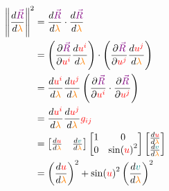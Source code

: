 \begin{align*}
    \norm{\frac{d\begingroup\color{violet}\vec{R}\endgroup}{d\begingroup\color{orange}\lambda\endgroup}}^2 &=
    \frac{d\begingroup\color{violet}\vec{R}\endgroup}{d\begingroup\color{orange}\lambda\endgroup} \cdot \frac{d\begingroup\color{violet}\vec{R}\endgroup}{d\begingroup\color{orange}\lambda\endgroup}\\
    &= \left(\frac{\partial \begingroup\color{violet}\vec{R}\endgroup}{\partial \begingroup\color{red}u^i\endgroup} \frac{d \begingroup\color{red}u^i\endgroup}{d \begingroup\color{orange}\lambda\endgroup}\right) \cdot 
    \left(\frac{\partial \begingroup\color{violet}\vec{R}\endgroup}{\partial \begingroup\color{red}u^j\endgroup}\frac{d \begingroup\color{red}u^j\endgroup}{d \begingroup\color{orange}\lambda\endgroup}\right)\\
    &= \frac{d \begingroup\color{red}u^i\endgroup}{d \begingroup\color{orange}\lambda\endgroup} \frac{d \begingroup\color{red}u^j\endgroup}{d \begingroup\color{orange}\lambda\endgroup}
    \left(\frac{\partial \begingroup\color{violet}\vec{R}\endgroup}{\partial \begingroup\color{red}u^i\endgroup} \cdot \frac{\partial \begingroup\color{violet}\vec{R}\endgroup}{\partial \begingroup\color{red}u^j\endgroup}\right)\\
    &= \frac{d \begingroup\color{red}u^i\endgroup}{d \begingroup\color{orange}\lambda\endgroup} \frac{d \begingroup\color{red}u^j\endgroup}{d \begingroup\color{orange}\lambda\endgroup} \begingroup\color{red}g_{ij}\endgroup\\
    &= \begin{bmatrix}
        \frac{d \begingroup\color{red}u\endgroup}{d \begingroup\color{orange}\lambda\endgroup} & \frac{d \begingroup\color{teal}v\endgroup}{d \begingroup\color{orange}\lambda\endgroup}
    \end{bmatrix} \begin{bmatrix}
        1 & 0\\
        0 & \sin(\begingroup\color{red}u\endgroup)^2
    \end{bmatrix} \begin{bmatrix}
        \frac{d \begingroup\color{red}u\endgroup}{d \begingroup\color{orange}\lambda\endgroup}\\
        \frac{d \begingroup\color{teal}v\endgroup}{d \begingroup\color{orange}\lambda\endgroup}
    \end{bmatrix} \\
    &= \left(\frac{d \begingroup\color{red}u\endgroup}{d \begingroup\color{orange}\lambda\endgroup}\right)^2
    + \sin(\begingroup\color{red}u\endgroup)^2 \left(\frac{d \begingroup\color{teal}v\endgroup}{d \begingroup\color{orange}\lambda\endgroup}\right)^2
\end{align*}

